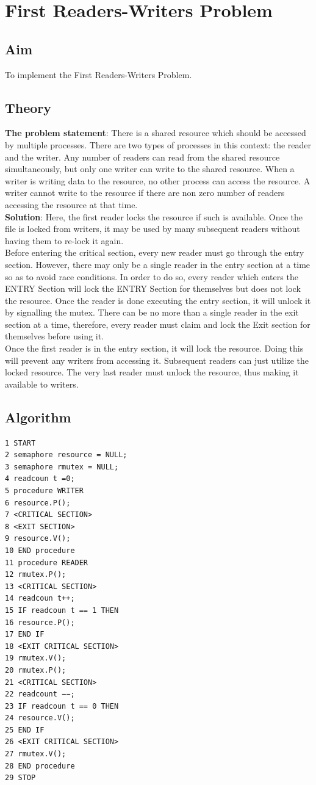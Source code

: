 \section{First Readers-Writers Problem}
\subsection{Aim}
To implement the First Readers-Writers Problem.

\subsection{Theory}
\textbf{The problem statement}: There is a shared resource which should be accessed by
multiple processes. There are two types of processes in this context: the reader and
the writer. Any number of readers can read from the shared resource simultaneously,
but only one writer can write to the shared resource. When a writer is writing data
to the resource, no other process can access the resource. A writer cannot write to
the resource if there are non zero number of readers accessing the resource at that
time. \\
\textbf{Solution}: Here, the first reader locks the resource if such is available. Once the file
is locked from writers, it may be used by many subsequent readers without having
them to re-lock it again. \\
Before entering the critical section, every new reader must go through the entry
section. However, there may only be a single reader in the entry section at a time so
as to avoid race conditions. In order to do so, every reader which enters the ENTRY
Section will lock the ENTRY Section for themselves but does not lock the resource.
Once the reader is done executing the entry section, it will unlock it by signalling
the mutex. There can be no more than a single reader in the exit section at a time,
therefore, every reader must claim and lock the Exit section for themselves before
using it. \\
Once the first reader is in the entry section, it will lock the resource. Doing
this will prevent any writers from accessing it. Subsequent readers can just utilize
the locked resource. The very last reader must unlock the resource, thus making it
available to writers.

\subsection{Algorithm}
\begin{verbatim}
1 START
2 semaphore resource = NULL;
3 semaphore rmutex = NULL;
4 readcoun t =0;
5 procedure WRITER
6 resource.P();
7 <CRITICAL SECTION>
8 <EXIT SECTION>
9 resource.V();
10 END procedure
11 procedure READER
12 rmutex.P();
13 <CRITICAL SECTION>
14 readcoun t++;
15 IF readcoun t == 1 THEN
16 resource.P();
17 END IF
18 <EXIT CRITICAL SECTION>
19 rmutex.V();
20 rmutex.P();
21 <CRITICAL SECTION>
22 readcount −−;
23 IF readcoun t == 0 THEN
24 resource.V();
25 END IF
26 <EXIT CRITICAL SECTION>
27 rmutex.V();
28 END procedure
29 STOP
\end{verbatim}

